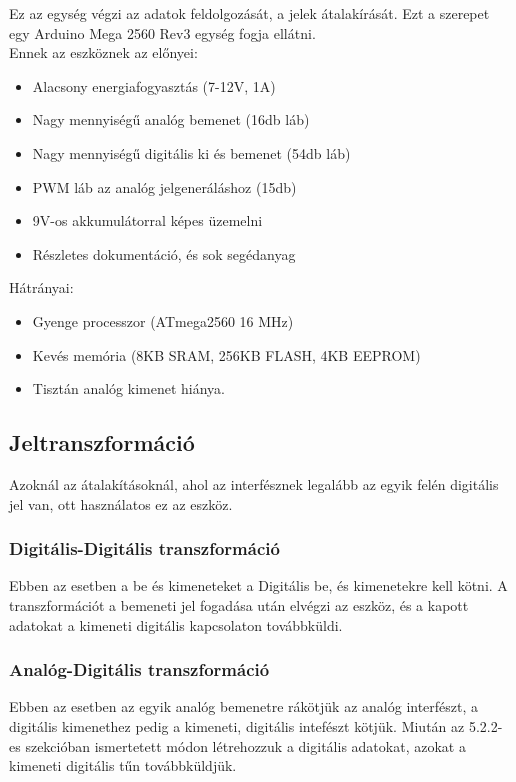 Ez az egység végzi az adatok feldolgozását, a jelek átalakírását.
Ezt a szerepet egy Arduino Mega 2560 Rev3 egység fogja ellátni\cite{parmar2017design}.\\Ennek az eszköznek az előnyei:
\begin{itemize}
    \item Alacsony energiafogyasztás (7-12V, 1A)\cite{arduino_docs}
    \item Nagy mennyiségű analóg bemenet (16db láb)\cite{arduino_docs}
    \item Nagy mennyiségű digitális ki és bemenet (54db láb)\cite{arduino_docs}
    \item PWM láb az analóg jelgeneráláshoz (15db)\cite{arduino_docs}
    \item 9V-os akkumulátorral képes üzemelni \cite{arduino_docs}
    \item Részletes dokumentáció, és sok segédanyag
\end{itemize}
Hátrányai:
\begin{itemize}
    \item Gyenge processzor (ATmega2560 16 MHz)\cite{arduino_docs}
    \item Kevés memória (8KB SRAM, 256KB FLASH, 4KB EEPROM)\cite{arduino_docs}
    \item Tisztán analóg kimenet hiánya.
\end{itemize}
\subsection{Jeltranszformáció}
Azoknál az átalakításoknál, ahol az interfésznek legalább az egyik felén digitális jel van, ott használatos ez az eszköz.
\subsubsection{Digitális-Digitális transzformáció}
Ebben az esetben a be és kimeneteket a Digitális be, és kimenetekre kell kötni. A transzformációt a bemeneti jel fogadása után elvégzi az eszköz, és a kapott adatokat a kimeneti digitális kapcsolaton továbbküldi.
\subsubsection{Analóg-Digitális transzformáció}
Ebben az esetben az egyik analóg bemenetre rákötjük az analóg interfészt, a digitális kimenethez pedig a kimeneti, digitális intefészt kötjük. Miután az 5.2.2-es szekcióban ismertetett módon létrehozzuk a digitális adatokat, azokat a kimeneti digitális tűn továbbküldjük.
